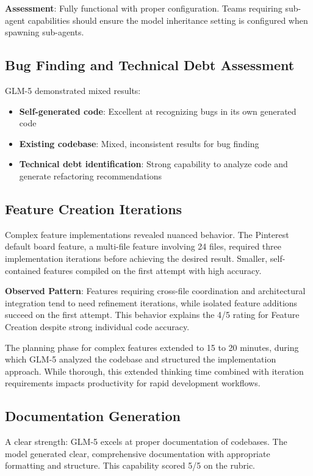 \documentclass[conference]{IEEEtran}
\begin{document}
\textbf{Assessment}: Fully functional with proper configuration. Teams requiring sub-agent capabilities should ensure the model inheritance setting is configured when spawning sub-agents.

\subsection{Bug Finding and Technical Debt Assessment}
GLM-5 demonstrated mixed results:
\begin{itemize}
    \item \textbf{Self-generated code}: Excellent at recognizing bugs in its own generated code
    \item \textbf{Existing codebase}: Mixed, inconsistent results for bug finding
    \item \textbf{Technical debt identification}: Strong capability to analyze code and generate refactoring recommendations
\end{itemize}

\subsection{Feature Creation Iterations}
Complex feature implementations revealed nuanced behavior. The Pinterest default board feature, a multi-file feature involving 24 files, required three implementation iterations before achieving the desired result. Smaller, self-contained features compiled on the first attempt with high accuracy.

\textbf{Observed Pattern}: Features requiring cross-file coordination and architectural integration tend to need refinement iterations, while isolated feature additions succeed on the first attempt. This behavior explains the 4/5 rating for Feature Creation despite strong individual code accuracy.

The planning phase for complex features extended to 15 to 20 minutes, during which GLM-5 analyzed the codebase and structured the implementation approach. While thorough, this extended thinking time combined with iteration requirements impacts productivity for rapid development workflows.

\subsection{Documentation Generation}
A clear strength: GLM-5 excels at proper documentation of codebases. The model generated clear, comprehensive documentation with appropriate formatting and structure. This capability scored 5/5 on the rubric.
\end{document}
